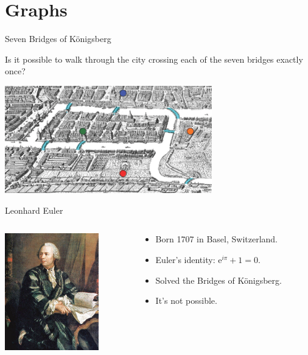 \documentclass{beamer}
\begin{document}
\section{Graphs}

\begin{frame}{Seven Bridges of K{\"o}nigsberg}
    \begin{alertblock}{Is it possible to walk through the city crossing each of the seven bridges exactly once?}
    \begin{center}
      \includegraphics[width=9cm]{img/konigsberg.png}
    \end{center}
  \end{alertblock}
  \end{frame}
  
  \begin{frame}{Leonhard Euler}  
    \begin{columns}[T]
      \begin{column}{0.3\textwidth}
        \includegraphics[height=2in]{img/euler.jpg}
      \end{column}
      \begin{column}{0.65\textwidth}
        \begin{itemize}
          \setlength\itemsep{3mm}
          \item Born 1707 in Basel, Switzerland.
          \item Euler's identity: $\mathrm{e}^{i \pi} + 1 = 0$.
          \item Solved the Bridges of K{\"o}nigsberg.
          \item It's not possible.
        \end{itemize}
      \end{column}
    
    \end{columns}
  \end{frame}
  
\end{document}
